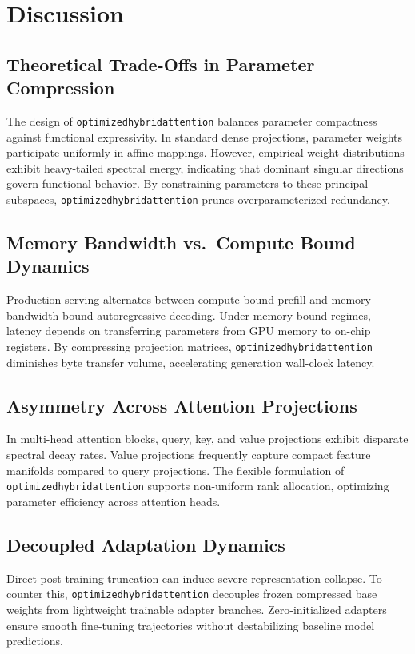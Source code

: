 \section{Discussion}

\subsection{Theoretical Trade-Offs in Parameter Compression}
The design of \texttt{optimizedhybridattention} balances parameter compactness against functional expressivity. In standard dense projections, parameter weights participate uniformly in affine mappings. However, empirical weight distributions exhibit heavy-tailed spectral energy, indicating that dominant singular directions govern functional behavior. By constraining parameters to these principal subspaces, \texttt{optimizedhybridattention} prunes overparameterized redundancy.

\subsection{Memory Bandwidth vs.\ Compute Bound Dynamics}
Production serving alternates between compute-bound prefill and memory-bandwidth-bound autoregressive decoding. Under memory-bound regimes, latency depends on transferring parameters from GPU memory to on-chip registers. By compressing projection matrices, \texttt{optimizedhybridattention} diminishes byte transfer volume, accelerating generation wall-clock latency.

\subsection{Asymmetry Across Attention Projections}
In multi-head attention blocks, query, key, and value projections exhibit disparate spectral decay rates. Value projections frequently capture compact feature manifolds compared to query projections. The flexible formulation of \texttt{optimizedhybridattention} supports non-uniform rank allocation, optimizing parameter efficiency across attention heads.

\subsection{Decoupled Adaptation Dynamics}
Direct post-training truncation can induce severe representation collapse. To counter this, \texttt{optimizedhybridattention} decouples frozen compressed base weights from lightweight trainable adapter branches. Zero-initialized adapters ensure smooth fine-tuning trajectories without destabilizing baseline model predictions.

